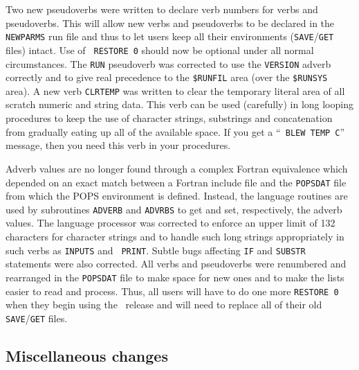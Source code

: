 Two new pseudoverbs were written to declare verb numbers for verbs
and pseudoverbs.  This will allow new verbs and pseudoverbs to be
declared in the {\tt NEWPARMS} run file and thus to let users keep all
their environments ({\tt SAVE}/{\tt GET} files) intact.  Use of {\tt
RESTORE 0} should now be optional under all normal circumstances.  The
{\tt RUN} pseudoverb was corrected to use the {\tt VERSION} adverb
correctly and to give real precedence to the {\tt \$RUNFIL} area (over
the {\tt \$RUNSYS} area).  A new verb {\tt CLRTEMP} was written to
clear the temporary literal area of all scratch numeric and string
data.  This verb can be used (carefully) in long looping procedures to
keep the use of character strings, substrings and concatenation from
gradually eating up all of the available space.  If you get a ``{\tt
BLEW TEMP C}'' message, then you need this verb in your procedures.

Adverb values are no longer found through a complex Fortran
equivalence which depended on an exact match between a Fortran include
file and the {\tt POPSDAT} file from which the POPS environment is
defined.  Instead, the language routines are used by subroutines
{\tt ADVERB} and {\tt ADVRBS} to get and set, respectively, the adverb
values.  The language processor was corrected to enforce an upper
limit of 132 characters for character strings and to handle such long
strings appropriately in such verbs as {\tt INPUTS} and \hbox{{\tt
PRINT}}.  Subtle bugs affecting {\tt IF} and {\tt SUBSTR} statements
were also corrected.  All verbs and pseudoverbs were renumbered and
rearranged in the {\tt POPSDAT} file to make space for new ones and to
make the lists easier to read and process.  Thus, all users will have
to do one more {\tt RESTORE 0} when they begin using the \RELEASENAME\
release and will need to replace all of their old {\tt SAVE}/{\tt GET}
files.

\subsection{Miscellaneous changes}

